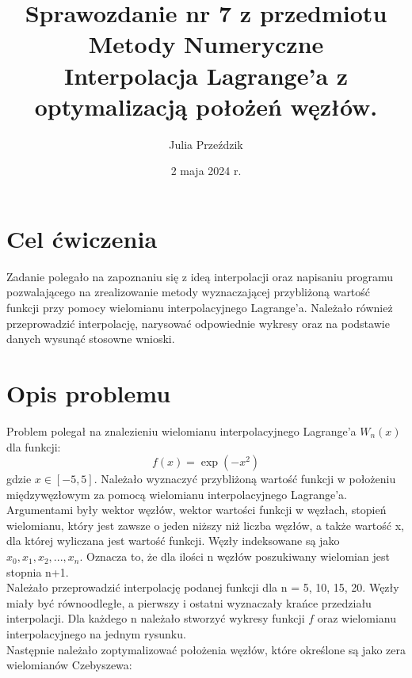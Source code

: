 \documentclass{article}
\begin{document}
\Large

\title{\LARGE Sprawozdanie nr 7 z przedmiotu Metody Numeryczne\\
       \LARGE Interpolacja Lagrange’a z optymalizacją położeń węzłów.}
\author{Julia Przeździk}
\date{2 maja 2024 r.}
\maketitle

\large

\section{Cel ćwiczenia}

Zadanie polegało na zapoznaniu się z ideą interpolacji oraz napisaniu programu pozwalającego na zrealizowanie metody wyznaczającej przybliżoną wartość funkcji przy pomocy wielomianu interpolacyjnego Lagrange'a. Należało również przeprowadzić interpolację, narysować odpowiednie wykresy oraz na podstawie danych wysunąć stosowne wnioski. 

\section{Opis problemu}

Problem polegał na znalezieniu wielomianu interpolacyjnego Lagrange’a $W_n(x)$ dla funkcji:
\begin{equation*}
f(x) = \exp(-x^2)
\end{equation*}
gdzie $x \in [-5, 5]$. Należało wyznaczyć przybliżoną wartość funkcji w położeniu międzywęzłowym za pomocą wielomianu interpolacyjnego Lagrange'a. Argumentami były wektor węzłów, wektor wartości funkcji w węzłach, stopień wielomianu, który jest zawsze o jeden niższy niż liczba węzłów, a także wartość x, dla której wyliczana jest wartość funkcji. Węzły indeksowane są jako $x_0, x_1, x_2, ..., x_n$. Oznacza to, że dla ilości n węzłów poszukiwany wielomian jest stopnia n+1. \\
Należało przeprowadzić interpolację podanej funkcji dla n = 5, 10, 15, 20. Węzły miały być równoodległe, a pierwszy i ostatni wyznaczały krańce przedziału interpolacji. Dla każdego n należało stworzyć wykresy funkcji $f$ oraz wielomianu interpolacyjnego na jednym rysunku. \\
Następnie należało zoptymalizować położenia węzłów, które określone są jako zera wielomianów Czebyszewa:
\end{document}
